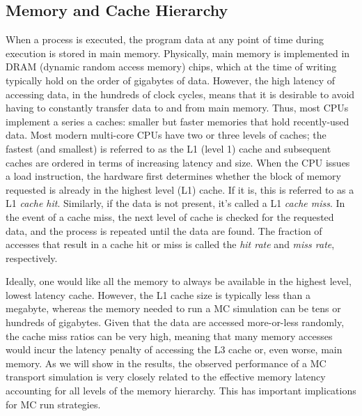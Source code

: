 \documentclass{mc2015}
\begin{document}
\subsection{Memory and Cache Hierarchy}

When a process is executed, the program data at any point of time during
execution is stored in main memory. Physically, main memory is implemented in
DRAM (dynamic random access memory) chips, which at the time of writing
typically hold on the order of gigabytes of data. However, the high latency of
accessing data, in the hundreds of clock cycles, means that it is desirable to
avoid having to constantly transfer data to and from main memory. Thus, most
CPUs implement a series a caches: smaller but faster memories that hold
recently-used data. Most modern multi-core CPUs have two or three levels of
caches; the fastest (and smallest) is referred to as the L1 (level 1) cache and
subsequent caches are ordered in terms of increasing latency and size. When the
CPU issues a load instruction, the hardware first determines whether the block
of memory requested is already in the highest level (L1) cache. If it is, this
is referred to as a L1 \emph{cache hit}. Similarly, if the data is not present,
it's called a L1 \emph{cache miss}. In the event of a cache miss, the next
level of cache is checked for the requested data, and the process is repeated
until the data are found. The fraction of accesses that result in a cache hit
or miss is called the \emph{hit rate} and \emph{miss rate}, respectively.

Ideally, one would like all the memory to always be available in the highest
level, lowest latency cache. However, the L1 cache size is typically less than
a megabyte, whereas the memory needed to run a MC simulation can be tens or
hundreds of gigabytes. Given that the data are accessed more-or-less randomly,
the cache miss ratios can be very high, meaning that many memory accesses would
incur the latency penalty of accessing the L3 cache or, even worse, main
memory.
As we will show in the results, the observed performance of a MC
transport simulation is very closely related to the effective memory latency
accounting for all levels of the memory hierarchy. This has important
implications for MC run strategies.
\end{document}
